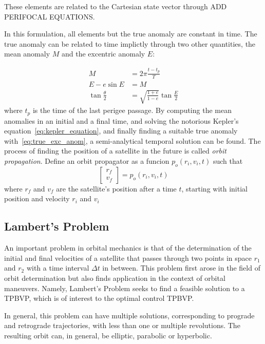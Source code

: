 These elements are related to the Cartesian state vector through ADD PERIFOCAL EQUATIONS.

In this formulation, all elements but the true anomaly are constant in time. The true anomaly can be related to time implictly through two other quantities, the mean anomaly \(M\) and the excentric anomaly \(E\):

\begin{align} 
        M &= 2\pi \frac{t - t_p}{T} \\
        E - e \sin{E} &= M \label{eq:kepler_equation}\\
        \tan{\frac{\theta}{2}} &= \sqrt{\frac{1+e}{1-e}} \tan{\frac{E}{2}} \label{eq:true_exc_anom}
\end{align}
where \(t_p\) is the time of the last perigee passage. By computing the mean anomalies in an initial and a final time, and solving the notorious Kepler's equation~\eqref{eq:kepler_equation}, and finally finding a suitable true anomaly with~\eqref{eq:true_exc_anom}, a semi-analytical temporal solution can be found. The process of finding the position of a satellite in the future is called \textit{orbit propagation}. Define an orbit propagator as a funcion \(p_o(r_i, v_i, t)\) such that
\begin{equation}
    \begin{bmatrix}
        r_f \\ v_f
    \end{bmatrix} = p_o(r_i, v_i, t)
\end{equation}
where \(r_f\) and \(v_f\) are the satellite's position after a time \(t\), starting with initial position and velocity \(r_i\) and \(v_i\)

\subsection{Lambert's Problem}

An important problem in orbital mechanics is that of the determination of the initial and final velocities of a satellite that passes through two points in space \(r_1\) and \(r_2\) with a time interval \(\Delta t\) in between. This problem first arose in the field of orbit determination but also finds application in the context of orbital maneuvers. Namely, Lambert's Problem seeks to find a feasible solution to a TPBVP, which is of interest to the optimal control TPBVP.

In general, this problem can have multiple solutions, corresponding to prograde and retrograde trajectories, with less than one or multiple revolutions. The resulting orbit can, in general, be elliptic, parabolic or hyperbolic. 

